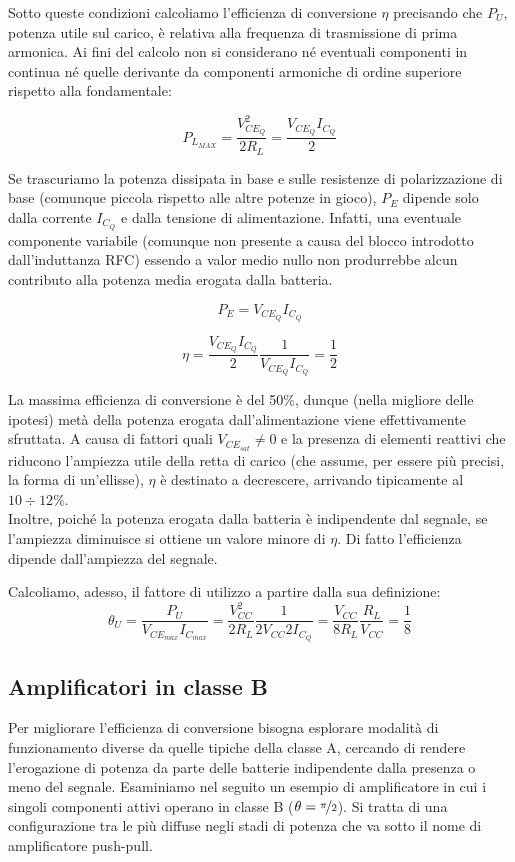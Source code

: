Sotto queste condizioni calcoliamo l'efficienza di conversione $\eta$ precisando che $P_U$, potenza utile sul carico, è relativa alla frequenza di trasmissione di prima armonica. Ai fini del calcolo non si considerano né eventuali componenti in continua né quelle derivante da componenti armoniche di ordine superiore rispetto alla fondamentale:

\[ P_{L_{MAX}} = \frac{V_{CE_Q}^2}{2R_L} = \frac{V_{CE_Q}I_{C_Q}}{2} \]

Se trascuriamo la potenza dissipata in base e sulle resistenze di polarizzazione di base (comunque
piccola rispetto alle altre potenze in gioco), $P_E$ dipende solo dalla corrente $I_{C_Q}$ e dalla tensione di alimentazione. Infatti, una eventuale componente variabile (comunque non presente a causa del blocco introdotto dall'induttanza RFC) essendo a valor medio nullo non produrrebbe alcun contributo alla potenza media erogata dalla batteria.

$$P_E = V_{CE_Q} I_{C_Q}$$

$$ \eta = \frac{V_{CE_Q}I_{C_Q}}{2} \frac{1}{V_{CE_Q} I_{C_Q}} = \frac{1}{2}$$

La massima efficienza di conversione è del 50\%, dunque (nella migliore delle ipotesi) metà della potenza erogata dall'alimentazione viene effettivamente sfruttata. A causa di fattori quali $V_{CE_{sat}}\neq 0$ e la presenza di elementi reattivi che riducono l'ampiezza utile della retta di carico (che assume, per essere più precisi, la forma di un'ellisse), $\eta$ è destinato a decrescere, arrivando tipicamente al $10\div12\%$.\\
Inoltre, poiché la potenza erogata dalla batteria è indipendente dal segnale, se l'ampiezza diminuisce si ottiene un valore minore di $\eta$. Di fatto l'efficienza dipende dall'ampiezza del segnale.

Calcoliamo, adesso, il fattore di utilizzo a partire dalla sua definizione:
\[ \theta_U = \frac{P_U}{V_{CE_{max}} I_{C_{max}}}=
\frac{V_{CC}^2}{2 R_L} \frac{1}{2V_{CC} 2I_{C_Q}}=
\frac{V_{CC}}{8R_L} \frac{R_L}{V_{CC}} = \frac{1}{8}\]

\subsection{Amplificatori in classe B}

Per migliorare l'efficienza di conversione bisogna esplorare modalità di funzionamento diverse da
quelle tipiche della classe A, cercando di rendere l'erogazione di potenza da parte delle batterie
indipendente dalla presenza o meno del segnale.
Esaminiamo nel seguito un esempio di
amplificatore in cui i singoli componenti attivi operano in classe B ($\theta = \nicefrac{\pi}{2}$). Si tratta di una configurazione tra le più diffuse negli stadi di potenza che va sotto il nome di amplificatore push-pull.

